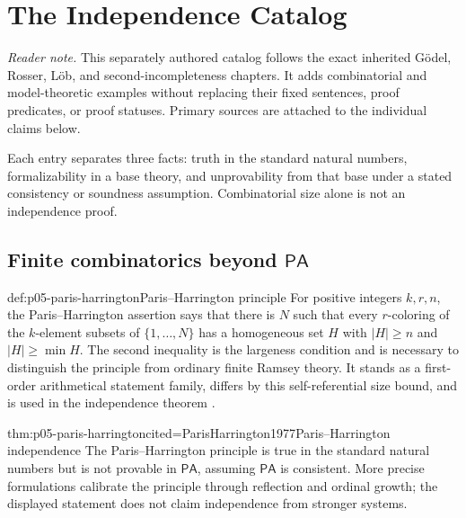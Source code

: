 \chapter{The Independence Catalog}\label{sec:p05-independence-catalog}

\noindent\textit{Reader note.}  This separately authored catalog follows the
exact inherited G\"odel, Rosser, L\"ob, and second-incompleteness chapters.  It
adds combinatorial and model-theoretic examples without replacing their fixed
sentences, proof predicates, or proof statuses.  Primary sources are attached
to the individual claims below.

Each entry separates three facts: truth in the standard natural numbers,
formalizability in a base theory, and unprovability from that base under a
stated consistency or soundness assumption. Combinatorial size alone is not an
independence proof.

\section{Finite combinatorics beyond \(\mathsf{PA}\)}

\begin{hbdefinition}{def:p05-paris-harrington}{Paris--Harrington principle}
For positive integers \(k,r,n\), the Paris--Harrington assertion says that
there is \(N\) such that every \(r\)-coloring of the \(k\)-element subsets of
\(\{1,\ldots,N\}\) has a homogeneous set \(H\) with
\(|H|\ge n\) and \(|H|\ge\min H\). The second inequality is the largeness
condition and is necessary to distinguish the principle from ordinary finite
Ramsey theory. It stands as a first-order arithmetical statement family,
differs by this self-referential size bound, and is used in the independence
theorem \cite{ParisHarrington1977}.
\end{hbdefinition}

\begin{hbtheorem}{thm:p05-paris-harrington}{cited=ParisHarrington1977}{Paris--Harrington independence}
The Paris--Harrington principle is true in the standard natural numbers but is
not provable in \(\mathsf{PA}\), assuming \(\mathsf{PA}\) is consistent. More
precise formulations calibrate the principle through reflection and ordinal
growth; the displayed statement does not claim independence from stronger
systems.
\end{hbtheorem}

